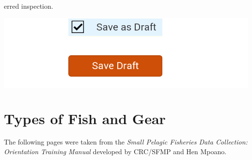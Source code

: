 \documentclass[a4paper]{refart}
\begin{document}
erred inspection.

\includegraphics[width=\textwidth]{enketo4.png}





\section{Types of Fish and Gear}
The following pages were taken from the \textit{Small Pelagic Fisheries Data Collection: Orientation Training Manual} developed by CRC/SFMP and Hen Mpoano.



\end{document}
